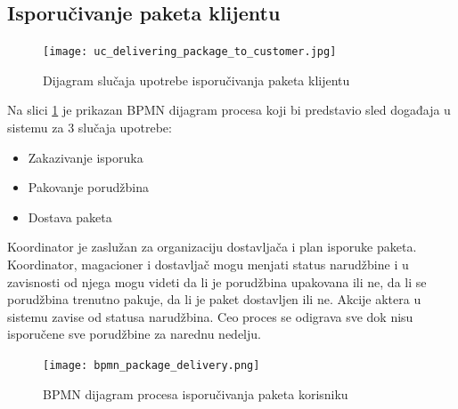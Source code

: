 \subsection{Isporučivanje paketa klijentu}
\begin{figure}[H]
	\begin{center}
		\texttt{[image: uc\_delivering\_package\_to\_customer.jpg]}
	\end{center}
    \caption{Dijagram slučaja upotrebe isporučivanja paketa klijentu}
\end{figure}

Na slici \ref{fig:bpmnPackageDelivery} je prikazan BPMN dijagram procesa koji bi predstavio sled događaja u sistemu za 3 slučaja upotrebe: 
\begin{itemize}
	\item{Zakazivanje isporuka}
	\item{Pakovanje porudžbina }
	\item{Dostava paketa}
\end{itemize}

Koordinator je zaslužan za organizaciju dostavljača i plan isporuke paketa.  Koordinator, magacioner i dostavljač mogu menjati status narudžbine i u zavisnosti od njega mogu videti da li je porudžbina upakovana ili ne, da li se porudžbina trenutno pakuje, da li je paket dostavljen ili ne. Akcije aktera u sistemu zavise od statusa narudžbina. Ceo proces se odigrava sve dok nisu isporučene sve porudžbine za narednu nedelju.


\begin{figure}[H]
	\begin{center}
		\texttt{[image: bpmn\_package\_delivery.png]}
	\end{center}
    \caption{BPMN dijagram procesa isporučivanja paketa korisniku}
    \label{fig:bpmnPackageDelivery}
\end{figure}


